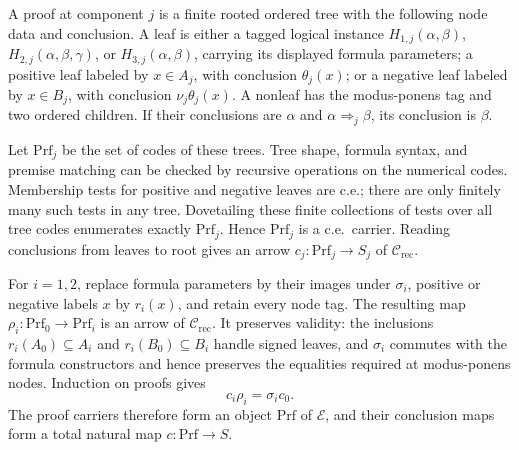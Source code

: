 \documentclass[11pt]{article}
\begin{document}
A proof at component $j$ is a finite rooted ordered tree with
the following node data and conclusion. A leaf is either a
tagged logical instance $H_{1,j}(\alpha,\beta)$,
$H_{2,j}(\alpha,\beta,\gamma)$, or
$H_{3,j}(\alpha,\beta)$, carrying its displayed formula
parameters; a positive leaf labeled by $x\in A_j$, with
conclusion $\theta_j(x)$; or a negative leaf labeled by
$x\in B_j$, with conclusion $\nu_j\theta_j(x)$.
A nonleaf has the modus-ponens tag and two ordered children.
If their conclusions are $\alpha$ and
$\alpha\Rightarrow_j\beta$, its conclusion is $\beta$.

Let $\mathrm{Prf}_j$ be the set of codes of these trees.
Tree shape, formula syntax, and premise matching can be checked
by recursive operations on the numerical codes. Membership tests
for positive and negative leaves are c.e.; there are only finitely
many such tests in any tree. Dovetailing these finite collections
of tests over all tree codes enumerates exactly $\mathrm{Prf}_j$.
Hence $\mathrm{Prf}_j$ is a c.e.\ carrier.
Reading conclusions from leaves to root gives an arrow
$c_j:\mathrm{Prf}_j\to S_j$ of $\mathcal C_{\mathrm{rec}}$.

For $i=1,2$, replace formula parameters by their images under
$\sigma_i$, positive or negative labels $x$ by $r_i(x)$, and
retain every node tag. The resulting map
$\rho_i:\mathrm{Prf}_0\to\mathrm{Prf}_i$ is an arrow of
$\mathcal C_{\mathrm{rec}}$.
It preserves validity: the inclusions $r_i(A_0)\subseteq A_i$
and $r_i(B_0)\subseteq B_i$ handle signed leaves, and
$\sigma_i$ commutes with the formula constructors and hence
preserves the equalities required at modus-ponens nodes.
Induction on proofs gives
\[
 c_i\rho_i=\sigma_i c_0.
\]
The proof carriers therefore form an object $\mathrm{Prf}$ of
$\mathcal E$, and their conclusion maps form a total natural map
$c:\mathrm{Prf}\to S$.
\end{document}
